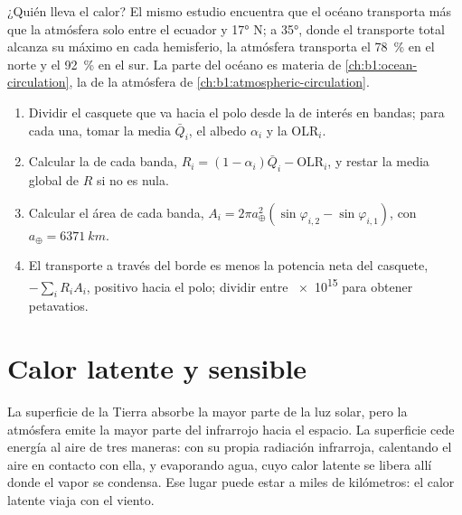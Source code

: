 ¿Quién lleva el calor? El mismo estudio encuentra que el océano transporta más que la atmósfera solo entre el ecuador y \ang{17} N; a \ang{35}, donde el transporte total alcanza su máximo en cada hemisferio, la atmósfera transporta el \qty{78}{\percent} en el norte y el \qty{92}{\percent} en el sur. La parte del océano es materia de \cref{ch:b1:ocean-circulation}, la de la atmósfera de \cref{ch:b1:atmospheric-circulation}.

\begin{method}\label{met:b1:radiation-heat-transport:bands}
\begin{enumerate}
  \item Dividir el casquete que va hacia el polo desde la  de interés en bandas; para cada una, tomar la  media $\bar Q_i$, el albedo $\alpha_i$ y la OLR$_i$.
  \item Calcular la  de cada banda, $R_i = (1 - \alpha_i)\bar Q_i -
        \text{OLR}_i$, y restar la media global de $R$ si no es nula.
  \item Calcular el área de cada banda, $A_i = 2\pi a_\oplus^2(\sin\varphi_{i,2} -
        \sin\varphi_{i,1})$, con $a_\oplus = \qty{6371}{km}$.
  \item El transporte a través del borde es menos la potencia neta del casquete,
        $-\sum_i R_i A_i$, positivo hacia el polo; dividir entre \num{e15} para obtener
        petavatios.
\end{enumerate}
\end{method}

\section{Calor latente y sensible}\label{sec:b1:radiation-heat-transport:latent}

La superficie de la Tierra absorbe la mayor parte de la luz solar, pero la atmósfera emite la mayor parte del infrarrojo hacia el espacio. La superficie cede energía al aire de tres maneras: con su propia radiación infrarroja, calentando el aire en contacto con ella, y evaporando agua, cuyo calor latente se libera allí donde el vapor se condensa. Ese lugar puede estar a miles de kilómetros: el calor latente viaja con el viento.

